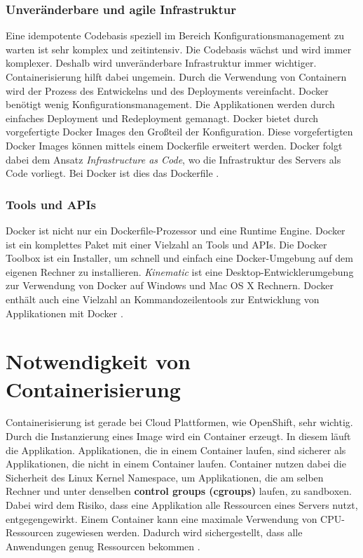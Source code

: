 \subsubsection{Unveränderbare und agile Infrastruktur}
Eine idempotente Codebasis speziell im Bereich Konfigurationsmanagement zu warten ist sehr komplex und zeitintensiv. Die Codebasis wächst und wird immer komplexer. Deshalb wird unveränderbare Infrastruktur immer wichtiger. Containerisierung hilft dabei ungemein. Durch die Verwendung von Containern wird der Prozess des Entwickelns und des Deployments vereinfacht. Docker benötigt wenig Konfigurationsmanagement. Die Applikationen werden durch einfaches Deployment und Redeployment gemanagt. 
Docker bietet durch vorgefertigte Docker Images den Großteil der Konfiguration. Diese vorgefertigten Docker Images können mittels einem Dockerfile erweitert werden. Docker folgt dabei dem Ansatz \textit{Infrastructure as Code}, wo die Infrastruktur des Servers als Code vorliegt. Bei Docker ist dies das Dockerfile \cite{DevelopingWithDocker}.

\subsubsection{Tools und APIs}
Docker ist nicht nur ein Dockerfile-Prozessor und eine Runtime Engine. Docker ist ein komplettes Paket mit einer Vielzahl an Tools und APIs. Die Docker Toolbox ist ein Installer, um schnell und einfach eine Docker-Umgebung auf dem eigenen Rechner zu installieren. \textit{Kinematic} ist eine Desktop-Entwicklerumgebung zur Verwendung von Docker auf Windows und Mac OS X Rechnern. Docker enthält auch eine Vielzahl an Kommandozeilentools zur Entwicklung von Applikationen mit Docker \cite{DevelopingWithDocker}.

\section{Notwendigkeit von Containerisierung}
Containerisierung ist gerade bei Cloud Plattformen, wie OpenShift, sehr wichtig. Durch die Instanzierung eines Image wird ein Container erzeugt. In diesem läuft die Applikation.
Applikationen, die in einem Container laufen, sind sicherer als Applikationen, die nicht in einem Container laufen. Container nutzen dabei die Sicherheit des Linux Kernel Namespace, um Applikationen, die am selben Rechner und unter denselben \textbf{control groups (cgroups)} laufen, zu sandboxen. Dabei wird dem Risiko, dass eine Applikation alle Ressourcen eines Servers nutzt, entgegengewirkt. Einem Container kann eine maximale Verwendung von CPU-Ressourcen zugewiesen werden. Dadurch wird sichergestellt, dass alle Anwendungen genug Ressourcen bekommen \cite{GettingStartedWithContainerization}.

